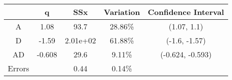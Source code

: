 \begin{center}
\begin{tabular}{|c|c|c|c|c|}
\cline{2-5}
\multicolumn{1}{c|}{} & q & SSx & Variation & Confidence Interval \\
\hline
A&1.08&93.7&28.86\% &(1.07, 1.1) \\
\hline
D&-1.59&2.01e+02&61.88\% &(-1.6, -1.57) \\
\hline
AD&-0.608&29.6&9.11\% &(-0.624, -0.593) \\
\hline
Errors& &0.44&0.14\% & \\
\hline
\end{tabular}
\end{center}
